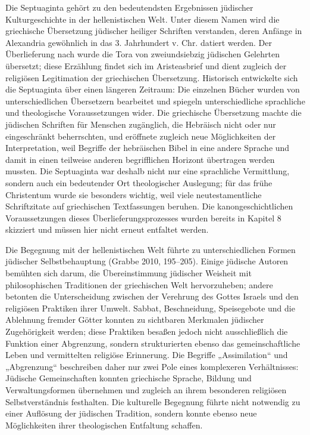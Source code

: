 \documentclass[fontsize=12pt]{mybib}
\begin{document}
Die Septuaginta gehört zu den bedeutendsten Ergebnissen jüdischer Kulturgeschichte in der hellenistischen Welt. Unter diesem Namen wird die griechische Übersetzung jüdischer heiliger Schriften verstanden, deren Anfänge in Alexandria gewöhnlich in das 3. Jahrhundert v. Chr. datiert werden. Der Überlieferung nach wurde die Tora von zweiundsiebzig jüdischen Gelehrten übersetzt; diese Erzählung findet sich im Aristeasbrief und dient zugleich der religiösen Legitimation der griechischen Übersetzung. Historisch entwickelte sich die Septuaginta über einen längeren Zeitraum: Die einzelnen Bücher wurden von unterschiedlichen Übersetzern bearbeitet und spiegeln unterschiedliche sprachliche und theologische Voraussetzungen wider. Die griechische Übersetzung machte die jüdischen Schriften für Menschen zugänglich, die Hebräisch nicht oder nur eingeschränkt beherrschten, und eröffnete zugleich neue Möglichkeiten der Interpretation, weil Begriffe der hebräischen Bibel in eine andere Sprache und damit in einen teilweise anderen begrifflichen Horizont übertragen werden mussten. Die Septuaginta war deshalb nicht nur eine sprachliche Vermittlung, sondern auch ein bedeutender Ort theologischer Auslegung; für das frühe Christentum wurde sie besonders wichtig, weil viele neutestamentliche Schriftzitate auf griechischen Textfassungen beruhen. Die kanongeschichtlichen Voraussetzungen dieses Überlieferungsprozesses wurden bereits in Kapitel 8 skizziert und müssen hier nicht erneut entfaltet werden.

Die Begegnung mit der hellenistischen Welt führte zu unterschiedlichen Formen jüdischer Selbstbehauptung (Grabbe 2010, 195–205). Einige jüdische Autoren bemühten sich darum, die Übereinstimmung jüdischer Weisheit mit philosophischen Traditionen der griechischen Welt hervorzuheben; andere betonten die Unterscheidung zwischen der Verehrung des Gottes Israels und den religiösen Praktiken ihrer Umwelt. Sabbat, Beschneidung, Speisegebote und die Ablehnung fremder Götter konnten zu sichtbaren Merkmalen jüdischer Zugehörigkeit werden; diese Praktiken besaßen jedoch nicht ausschließlich die Funktion einer Abgrenzung, sondern strukturierten ebenso das gemeinschaftliche Leben und vermittelten religiöse Erinnerung. Die Begriffe „Assimilation“ und „Abgrenzung“ beschreiben daher nur zwei Pole eines komplexeren Verhältnisses: Jüdische Gemeinschaften konnten griechische Sprache, Bildung und Verwaltungsformen übernehmen und zugleich an ihrem besonderen religiösen Selbstverständnis festhalten. Die kulturelle Begegnung führte nicht notwendig zu einer Auflösung der jüdischen Tradition, sondern konnte ebenso neue Möglichkeiten ihrer theologischen Entfaltung schaffen.
\end{document}
